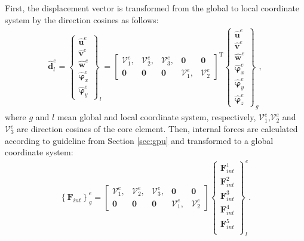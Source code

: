 First, the displacement vector is transformed from the global to local coordinate system by the direction cosines as follows:
\begin{eqnarray}
	\widehat{\textbf{d}}^e_l = \left \{\begin{array}{c}
		\widehat{\textbf{u}}^e \\ \widehat{\textbf{v}}^e \\
		\widehat{\textbf{w}}^e \\ \widehat{\boldsymbol{\varphi}}_x^e \\
		\widehat{\boldsymbol{\varphi}}_y^e
	\end{array}\right \}_l = 
	\left [\begin{array}{ccccc}
		\mathcal{V}^e_1, & \mathcal{V}^e_2, & \mathcal{V}^e_3, & \textbf{0} & \textbf{0} \\
		\textbf{0} & \textbf{0} & \textbf{0} & \mathcal{V}^e_1, & \mathcal{V}^e_2
	\end{array}\right ]^{\mathrm{T}}
	\left \{\begin{array}{c}
		\widehat{\textbf{u}}^e \\ \widehat{\textbf{v}}^e \\
		\widehat{\textbf{w}}^e \\ \widehat{\boldsymbol{\varphi}}_x^e \\
		\widehat{\boldsymbol{\varphi}}_y^e\\
		\widehat{\boldsymbol{\varphi}}_z^e
	\end{array}\right \}_g,
	\label{eq:d_local}
\end{eqnarray}
%
where \(g\) and \(l\) mean global and local coordinate system, respectively, \(\mathcal{V}^e_1\),\(\mathcal{V}^e_2\) and \(\mathcal{V}^e_3\) are direction cosines of the core element.
Then, internal forces are calculated according to guideline from Section \ref{sec:gpu} and transformed to a global coordinate system:
\begin{eqnarray}
	\left\{\textbf{F}_{int}\right\}^e_g =
	\left [\begin{array}{ccccc}
		\mathcal{V}^e_1, & \mathcal{V}^e_2, & \mathcal{V}^e_3, & \textbf{0} & \textbf{0} \\
		\textbf{0} & \textbf{0} & \textbf{0} & \mathcal{V}^e_1, & \mathcal{V}^e_2
	\end{array}\right ]
	\left \{\begin{array}{c}
		\textbf{F}^1_{int} \\
		\textbf{F}^2_{int} \\
		\textbf{F}^3_{int} \\
		\textbf{F}^4_{int} \\
		\textbf{F}^5_{int} \\
	\end{array}\right \}_l^e.
	\label{eq:f_global}
\end{eqnarray}

